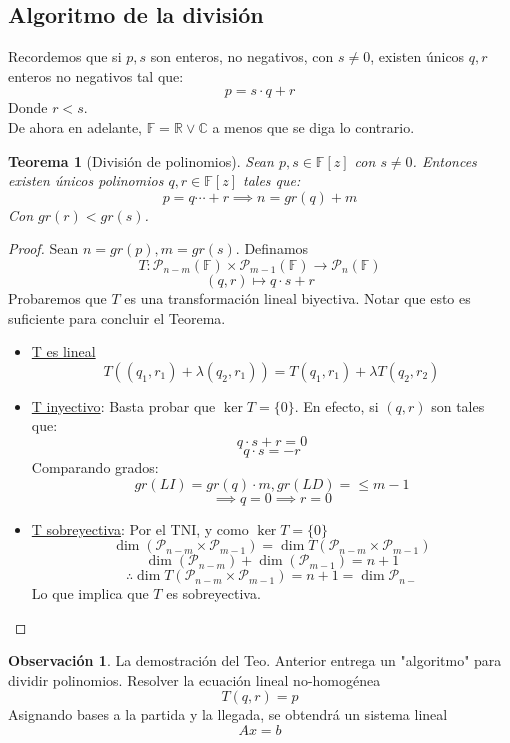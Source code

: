 \documentclass[11pt]{book}
\newtheorem{thm}{Teorema}[section]
\theoremstyle{definition}
\newtheorem{obs}{Observación}[section]
\begin{document}
\subsection{Algoritmo de la división}
Recordemos que si $p,s$ son enteros, no negativos, con $s\neq 0$, existen únicos $q,r$ enteros no negativos tal que:
\[p=s\cdot q+r\]
Donde $r<s$.\\
De ahora en adelante, $\mathbb{F}=\mathbb{R}\vee\mathbb{C}$ a menos que se diga lo contrario.
\begin{thm}[División de polinomios]
Sean $p,s\in\mathbb{F}[z]$ con $s\neq 0$. Entonces existen únicos polinomios $q,r\in\mathbb{F}[z]$ tales que:
\[p=q\cdots+r\implies n=gr(q)+m\]
Con $gr(r)<gr(s)$.
\end{thm}
\begin{proof}
Sean $n=gr(p), m=gr(s)$. Definamos
\[T:\mathcal{P}_{n-m}(\mathbb{F})\times\mathcal{P}_{m-1}(\mathbb{F})\rightarrow\mathcal{P}_{n}(\mathbb{F})\]
\[(q,r)\mapsto q\cdot s+r\]
Probaremos que $T$ es una transformación lineal biyectiva. Notar que esto es suficiente para concluir el Teorema.
\begin{itemize}
	\item \underline{T es lineal}
	\[T((q_1,r_1)+\lambda (q_2,r_1))=T(q_1,r_1)+\lambda T(q_2,r_2)\]
	
	\item \underline{T inyectivo}: Basta probar que $\ker T=\{0\}$. En efecto, si $(q,r)$ son tales que:
	\[q\cdot s+r=0\]
	\[q\cdot s=-r\]
	Comparando grados:
	\[gr(LI)=gr(q)\cdot m,gr(LD)=\leq m-1\]
	\[\implies q=0\implies r=0\]
	
	\item \underline{T sobreyectiva}: Por el TNI, y como $\ker T=\{0\}$
	\[\dim(\mathcal{P}_{n-m}\times\mathcal{P}_{m-1})=\dim T(\mathcal{P}_{n-m}\times\mathcal{P}_{m-1})\]
	\[\dim(\mathcal{P}_{n-m})+\dim(\mathcal{P}_{m-1})=n+1\]
	\[\therefore \dim T(\mathcal{P}_{n-m}\times\mathcal{P}_{m-1})=n+1=\dim\mathcal{P}_{n-}\]
	Lo que implica que $T$ es sobreyectiva.
\end{itemize}
\end{proof}
\begin{obs}
La demostración del Teo. Anterior entrega un "algoritmo" para dividir polinomios. Resolver la ecuación lineal no-homogénea
\[T(q,r)=p\]
Asignando bases a la partida y la llegada, se obtendrá un sistema lineal
\[Ax=b\]
\end{obs}
\end{document}
